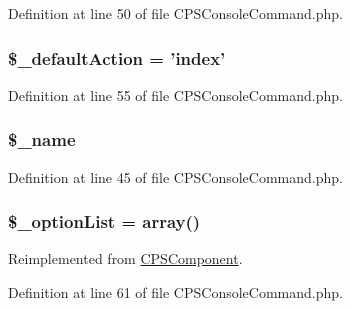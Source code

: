Definition at line 50 of file CPSConsoleCommand.php.

\hypertarget{classCPSConsoleCommand_a8e238d8b9c8fcc408b7e4c8d9af1a1c1}{
\subsubsection[{\$\_\-defaultAction}]{\setlength{\rightskip}{0pt plus 5cm}\$\_\-defaultAction = 'index'}}
\label{classCPSConsoleCommand_a8e238d8b9c8fcc408b7e4c8d9af1a1c1}


Definition at line 55 of file CPSConsoleCommand.php.

\hypertarget{classCPSConsoleCommand_a1c89defaf5aa7ac8e526065e8572f580}{
\subsubsection[{\$\_\-name}]{\setlength{\rightskip}{0pt plus 5cm}\$\_\-name}}
\label{classCPSConsoleCommand_a1c89defaf5aa7ac8e526065e8572f580}


Definition at line 45 of file CPSConsoleCommand.php.

\hypertarget{classCPSConsoleCommand_ac61132f2a103a25486245470090b0046}{
\subsubsection[{\$\_\-optionList}]{\setlength{\rightskip}{0pt plus 5cm}\$\_\-optionList = {\bf array}()}}
\label{classCPSConsoleCommand_ac61132f2a103a25486245470090b0046}


Reimplemented from \hyperlink{classCPSComponent_ac61132f2a103a25486245470090b0046}{CPSComponent}.



Definition at line 61 of file CPSConsoleCommand.php.

